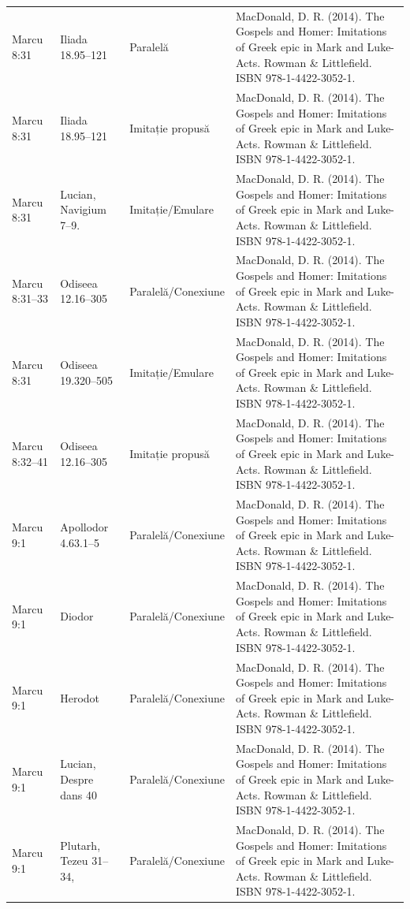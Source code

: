 \documentclass[12pt,a4paper,twoside,openany]{book}
\begin{document}
\begin{longtable}{L{1.4cm}L{1.7cm}L{3.1cm}L{8.4cm}}
Marcu 8:31 & Iliada 18.95–121 & Paralelă & MacDonald, D. R. (2014). The Gospels and Homer: Imitations of Greek epic in Mark and Luke-Acts. Rowman \& Littlefield. ISBN 978-1-4422-3052-1. \\
Marcu 8:31 & Iliada 18.95–121 & Imitație propusă & MacDonald, D. R. (2014). The Gospels and Homer: Imitations of Greek epic in Mark and Luke-Acts. Rowman \& Littlefield. ISBN 978-1-4422-3052-1. \\
Marcu 8:31 & Lucian, Navigium 7–9. & Imitație/Emulare & MacDonald, D. R. (2014). The Gospels and Homer: Imitations of Greek epic in Mark and Luke-Acts. Rowman \& Littlefield. ISBN 978-1-4422-3052-1. \\
Marcu 8:31–33 & Odiseea 12.16–305 & Paralelă/Conexiune & MacDonald, D. R. (2014). The Gospels and Homer: Imitations of Greek epic in Mark and Luke-Acts. Rowman \& Littlefield. ISBN 978-1-4422-3052-1. \\
Marcu 8:31 & Odiseea 19.320–505 & Imitație/Emulare & MacDonald, D. R. (2014). The Gospels and Homer: Imitations of Greek epic in Mark and Luke-Acts. Rowman \& Littlefield. ISBN 978-1-4422-3052-1. \\
Marcu 8:32–41 & Odiseea 12.16–305 & Imitație propusă & MacDonald, D. R. (2014). The Gospels and Homer: Imitations of Greek epic in Mark and Luke-Acts. Rowman \& Littlefield. ISBN 978-1-4422-3052-1. \\
Marcu 9:1 & Apollodor 4.63.1–5 & Paralelă/Conexiune & MacDonald, D. R. (2014). The Gospels and Homer: Imitations of Greek epic in Mark and Luke-Acts. Rowman \& Littlefield. ISBN 978-1-4422-3052-1. \\
Marcu 9:1 & Diodor & Paralelă/Conexiune & MacDonald, D. R. (2014). The Gospels and Homer: Imitations of Greek epic in Mark and Luke-Acts. Rowman \& Littlefield. ISBN 978-1-4422-3052-1. \\
Marcu 9:1 & Herodot & Paralelă/Conexiune & MacDonald, D. R. (2014). The Gospels and Homer: Imitations of Greek epic in Mark and Luke-Acts. Rowman \& Littlefield. ISBN 978-1-4422-3052-1. \\
Marcu 9:1 & Lucian, Despre dans 40 & Paralelă/Conexiune & MacDonald, D. R. (2014). The Gospels and Homer: Imitations of Greek epic in Mark and Luke-Acts. Rowman \& Littlefield. ISBN 978-1-4422-3052-1. \\
Marcu 9:1 & Plutarh, Tezeu 31–34, & Paralelă/Conexiune & MacDonald, D. R. (2014). The Gospels and Homer: Imitations of Greek epic in Mark and Luke-Acts. Rowman \& Littlefield. ISBN 978-1-4422-3052-1. \\

\end{longtable}
\end{document}
